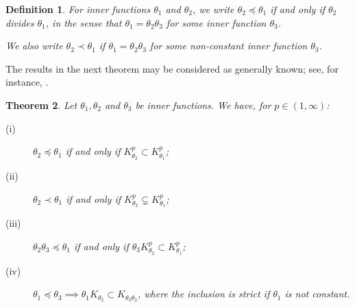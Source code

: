\documentclass[11pt]{article}
\def\CC{\mathbb{C}}
\def\ker{\mathop{\rm ker}\nolimits}
\renewcommand\span{\mathop{\rm span}\nolimits}
\def\spam{\span} %
\def\clos{{\rm clos}}
\newtheorem{thm}{Theorem}[section]
\newtheorem{defn}[thm]{Definition}
\numberwithin{equation}{section}
\def\beginpf{\begin{proof}}
\def\endpf{\end{proof}}
\begin{document}




\begin{defn}
For inner functions $\theta_1$ and $\theta_2$, we write $\theta_2 \preceq \theta_1$ if and only if $\theta_2$ divides $\theta_1$,
in the sense that $\theta_1 = \theta_2 \theta_3 $ for some inner function $\theta_3$.

We also write $\theta_2 \prec \theta_1$ if $\theta_1 = \theta_2 \theta_3 $ for some {\em non-constant\/}
inner function $\theta_3$.
\end{defn}

The results in the next theorem may be considered as generally known; see, for instance, \cite{Nikolski}. 

\begin{thm}\label{thm:prec}
Let  $\theta_1, \theta_2$ and $\theta_3$ be inner functions. We have, for $p \in (1,\infty)$:
\begin{description}
  \item[(i)] $\theta_2 \preceq \theta_1$ if and only if $K_{\theta_2}^p \subset K_{\theta_1}^p$;
  \item[(ii)] $\theta_2 \prec \theta_1$ if and only if $K_{\theta_2}^p \subsetneq K_{\theta_1}^p$;
  \item[(iii)] $\theta_2 \theta_3 \preceq \theta_1$ if and only if $\theta_3 K_{\theta_2}^p \subset K_{\theta_1}^p$;
 \item[(iv)] $\theta_1 \preceq \theta_3 \implies \theta_1 K_{\theta_2} \subset K_{\theta_3\theta_2}$, where the inclusion is strict if $\theta_1$ is not constant.
\end{description}

\end{thm}

\end{document}
